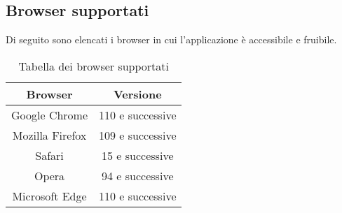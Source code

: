 \subsection{Browser supportati}
\par Di seguito sono elencati i browser in cui l'applicazione è accessibile e fruibile.

\begin{table}[H]
  \centering
  \begin{tabular}{|c|c|}
      \hline
      \textbf{Browser} & \textbf{Versione} \\
      \hline
      Google Chrome & 110 e successive \\
      \hline
      Mozilla Firefox & 109 e successive \\
      \hline
      Safari & 15 e successive \\
      \hline
      Opera & 94 e successive \\
      \hline
      Microsoft Edge & 110 e successive \\
      \hline
  \end{tabular}
  \caption{Tabella dei browser supportati}
\end{table}